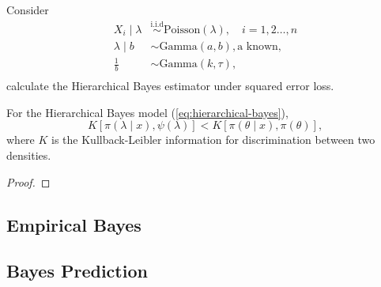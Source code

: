\begin{example}
	Consider
	\begin{equation}
		\begin{aligned}
			X_i\mid\lambda & \stackrel{\text{i.i.d}}{\sim} \text{Poisson}\left(\lambda\right),\quad i=1,2\ldots,n \\
			\lambda\mid b  & \sim \text{Gamma}\left(a,b\right), \text{a known},                                   \\
			\frac{1}{b}    & \sim \text{Gamma}\left(k,\tau\right),                                                \\
		\end{aligned}
	\end{equation}
	calculate the Hierarchical Bayes estimator under squared error loss.
\end{example}

\begin{theorem}
	For the Hierarchical Bayes model (\ref{eq:hierarchical-bayes}),
	\begin{equation}
		K\left[\pi\left(\lambda\mid x\right),\psi\left(\lambda\right)\right] < K\left[\pi\left(\theta\mid x\right),\pi\left(\theta\right)\right],
	\end{equation}
	where \(K\) is the Kullback-Leibler information for discrimination between two densities.
\end{theorem}

\begin{proof}

\end{proof}

\begin{remark}

\end{remark}

\subsection{Empirical Bayes}

\subsection{Bayes Prediction}
